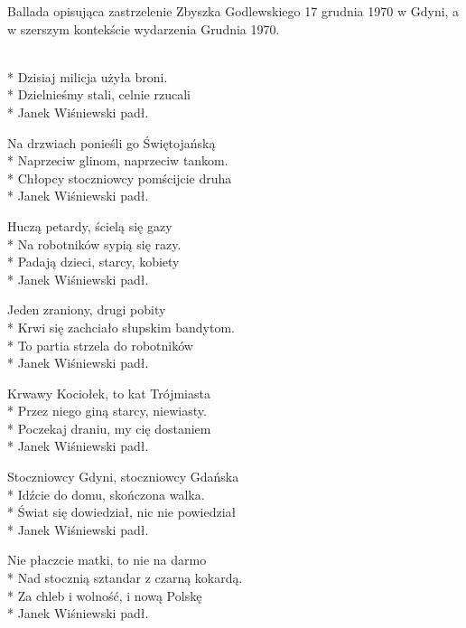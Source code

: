 \begin{info}Ballada opisująca zastrzelenie Zbyszka Godlewskiego 17 grudnia 1970 w Gdyni, a w szerszym kontekście wydarzenia Grudnia 1970.\end{info}

\begin{lyrics}[longestline={Świat się dowiedział, nic nie powiedział}]

\\*
Dzisiaj milicja użyła broni.\\*
Dzielnieśmy stali, celnie rzucali\\*
Janek Wiśniewski padł.

Na drzwiach ponieśli go Świętojańską\\*
Naprzeciw glinom, naprzeciw tankom.\\*
Chłopcy stoczniowcy pomścijcie druha\\*
Janek Wiśniewski padł.

Huczą petardy, ścielą się gazy\\*
Na robotników sypią się razy.\\*
Padają dzieci, starcy, kobiety\\*
Janek Wiśniewski padł.

Jeden zraniony, drugi pobity\\*
Krwi się zachciało słupskim bandytom.\\*
To partia strzela do robotników\\*
Janek Wiśniewski padł.

Krwawy Kociołek, to kat Trójmiasta\\*
Przez niego giną starcy, niewiasty.\\*
Poczekaj draniu, my cię dostaniem\\*
Janek Wiśniewski padł.

Stoczniowcy Gdyni, stoczniowcy Gdańska\\*
Idźcie do domu, skończona walka.\\*
Świat się dowiedział, nic nie powiedział\\*
Janek Wiśniewski padł.

Nie płaczcie matki, to nie na darmo\\*
Nad stocznią sztandar z czarną kokardą.\\*
Za chleb i wolność, i nową Polskę\\*
Janek Wiśniewski padł.
\end{lyrics}



